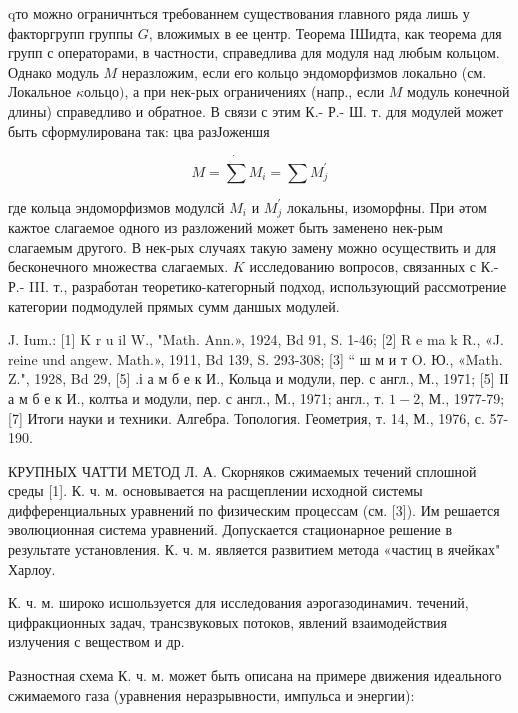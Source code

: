 \documentclass[10pt]{article}
\begin{document}
qто можно ограничнться требованнем существования главного ряда лишь у факторгрупп группы $G$, вложимых в ее центр. Теорема IШидта, как теорема для групп с операторами, в частности, справедлива для модуля над любым кольцом. Однако модуль $M$ неразложим, если его кольцо эндоморфизмов локально (см. Локальное $\kappa о л ь ц о)$, а при нек-рых ограничениях (напр., если $M$ модуль конечной длины) справедливо и обратное. В связи с этим К.- Р.- Ш. т. для модулей может быть сформулирована так: цва разЈоженшя



\[

M=\dot{\sum} M_{i}=\sum M_{j}^{\prime}

\]



где кольца эндоморфизмов модулсй $M_{i}$ и $M_{j}^{\prime}$ локальны, изоморфны. При әтом кажтое слагаемое одного из разложений может быть заменено нек-рым слагаемым другого. В нек-рых случаях такую замену можно осуществить и для бесконечного множества слагаемых. $K$ исследованию вопросов, связанных с К.- Р.- III. т., разработан теоретико-категорный подход, использующий рассмотрение категории подмодулей прямых сумм даншых модулей.



J. Ium.: [1] K r u il W., "Math. Ann.», 1924, Bd 91, S. 1-46; [2] R e ma k R., «J. reine und angew. Math.», 1911, Bd 139, S. 293-308; [3] “ ш м и т O. Ю., «Math. Z.", 1928, Bd 29, [5] .і а м б е к И., Кольца и модули, пер. с англ., М., 1971; [5] ІІ а м б е к И., колтьа и модули, пер. с англ., М., 1971; англ., т. $1-2$, М., 1977-79; [7] Итоги науки и техники. Алгебра. Топология. Геометрия, т. 14, М., 1976, с. 57-190.



КРУПНЫХ ЧАТТИ МЕТОД Л. А. Скорняков сжимаемых течений сплошной среды [1]. К. ч. м. основывается на расщеплении исходной системы дифференциальных уравнений по физическим процессам (см. [3]). Им решается эволюционная система уравнений. Допускается стационарное решение в результате установления. К. ч. м. является развитием метода «частиц в ячейках" Харлоу.



К. ч. м. широко исшользуется для исследования аэрогазодинамич. течений, цифракционных задач, трансзвуковых потоков, явлений взаимодействия излучения с веществом и др.



Разностная схема К. ч. м. может быть описана на примере движения идеального сжимаемого газа (уравнения неразрывности, импульса и энергии):
\end{document}
